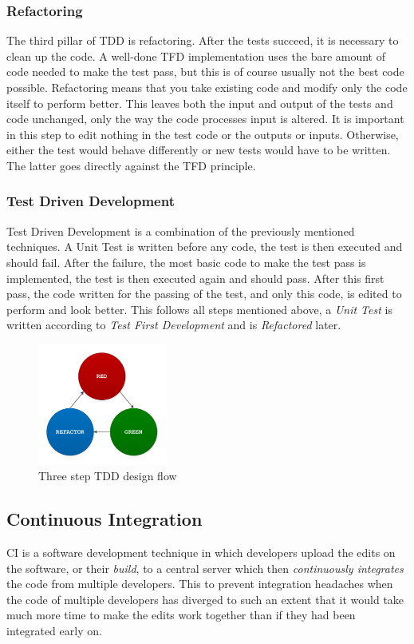 \documentclass[11pt,british]{article}
\begin{document}
\subsubsection{Refactoring}
The third pillar of TDD is refactoring. After the tests succeed, it is necessary to clean up the code. A well-done \gls{TFD} implementation uses the bare amount of code needed to make the test pass, but this is of course usually not the best code possible. Refactoring means that you take existing code and modify only the code itself to perform better. This leaves both the input and output of the tests and code unchanged, only the way the code processes input is altered. It is important in this step to edit nothing in the test code or the outputs or inputs. Otherwise, either the test would behave differently or new tests would have to be written. The latter goes directly against the \gls{TFD} principle.

\subsubsection{Test Driven Development}
Test Driven Development is a combination of the previously mentioned techniques. A Unit Test is written before any code, the test is then executed and should fail. After the failure, the most basic code to make the test pass is implemented, the test is then executed again and should pass. After this first pass, the code written for the passing of the test, and only this code, is edited to perform and look better. This follows all steps mentioned above, a \emph{Unit Test} is written according to \emph{Test First Development} and is \emph{Refactored} later.

\begin{figure}[h]
    \centering
	\includegraphics[width=0.38\textwidth]{images/tdd.pdf}
    \caption{Three step TDD design flow}
    \label{fig:TDD_Flow}
\end{figure}

\subsection{Continuous Integration}
\gls{CI} is a software development technique in which developers upload the edits on the software, or their \emph{build}, to a central server which then \emph{continuously integrates} the code from multiple developers. This to prevent integration headaches when the code of multiple developers has diverged to such an extent that it would take much more time to make the edits work together than if they had been integrated early on.
\end{document}
